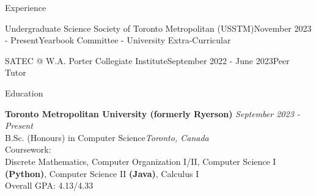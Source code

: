 \documentclass[
	10pt, %
]{resume} %
\begin{document}
\begin{rSection}{Experience}

	\begin{rSubsection}{Undergraduate Science Society of Toronto Metropolitan (USSTM)}{November 2023 - Present}{Yearbook Committee - University Extra-Curricular}{}
	\end{rSubsection}


	\begin{rSubsection}{SATEC @ W.A. Porter Collegiate Institute}{September 2022 - June 2023}{Peer Tutor}{}
	\end{rSubsection}


 \end{rSection}

\setstretch{}
\begin{rSection}{Education}
	
	\textbf{Toronto Metropolitan University (formerly Ryerson)} \hfill \textit{September 2023 - Present} \\ 
	B.Sc. (Honours) in Computer Science\hfill \textit{Toronto, Canada} \smallskip\\
	Coursework: \\
	Discrete Mathematics, Computer Organization I/II, Computer Science I \textbf{(Python)}, Computer Science II \textbf{(Java)}, Calculus I \\
	Overall GPA: 4.13/4.33
	
\end{rSection}

\end{document}
